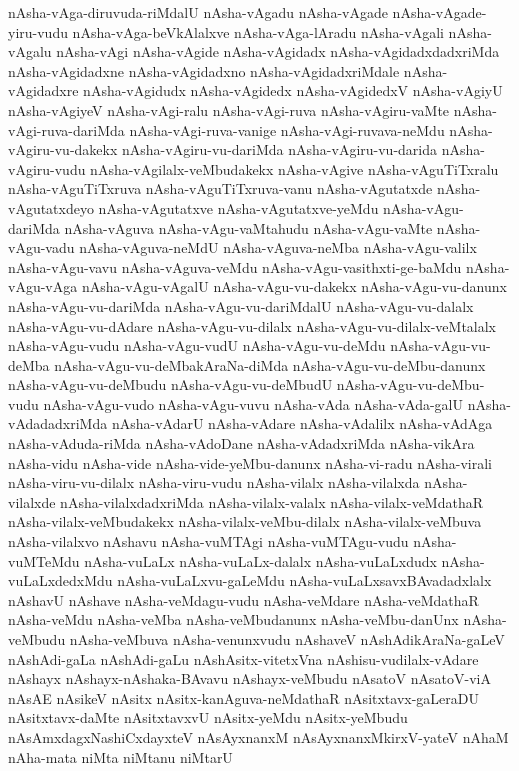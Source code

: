 {nAsha-vAga-diruvuda-riMdalU
nAsha-vAgadu
nAsha-vAgade
nAsha-vAgade-yiru-vudu
nAsha-vAga-beVkAlalxve
nAsha-vAga-lAradu
nAsha-vAgali
nAsha-vAgalu
nAsha-vAgi
nAsha-vAgide
nAsha-vAgidadx
nAsha-vAgidadxdadxriMda
nAsha-vAgidadxne
nAsha-vAgidadxno
nAsha-vAgidadxriMdale
nAsha-vAgidadxre
nAsha-vAgidudx
nAsha-vAgidedx
nAsha-vAgidedxV
nAsha-vAgiyU
nAsha-vAgiyeV
nAsha-vAgi-ralu
nAsha-vAgi-ruva
nAsha-vAgiru-vaMte
nAsha-vAgi-ruva-dariMda
nAsha-vAgi-ruva-vanige
nAsha-vAgi-ruvava-neMdu
nAsha-vAgiru-vu-dakekx
nAsha-vAgiru-vu-dariMda
nAsha-vAgiru-vu-darida
nAsha-vAgiru-vudu
nAsha-vAgilalx-veMbudakekx
nAsha-vAgive
nAsha-vAguTiTxralu
nAsha-vAguTiTxruva
nAsha-vAguTiTxruva-vanu
nAsha-vAgutatxde
nAsha-vAgutatxdeyo
nAsha-vAgutatxve
nAsha-vAgutatxve-yeMdu
nAsha-vAgu-dariMda
nAsha-vAguva
nAsha-vAgu-vaMtahudu
nAsha-vAgu-vaMte
nAsha-vAgu-vadu
nAsha-vAguva-neMdU
nAsha-vAguva-neMba
nAsha-vAgu-valilx
nAsha-vAgu-vavu
nAsha-vAguva-veMdu
nAsha-vAgu-vasithxti-ge-baMdu
nAsha-vAgu-vAga
nAsha-vAgu-vAgalU
nAsha-vAgu-vu-dakekx
nAsha-vAgu-vu-danunx
nAsha-vAgu-vu-dariMda
nAsha-vAgu-vu-dariMdalU
nAsha-vAgu-vu-dalalx
nAsha-vAgu-vu-dAdare
nAsha-vAgu-vu-dilalx
nAsha-vAgu-vu-dilalx-veMtalalx
nAsha-vAgu-vudu
nAsha-vAgu-vudU
nAsha-vAgu-vu-deMdu
nAsha-vAgu-vu-deMba
nAsha-vAgu-vu-deMbakAraNa-diMda
nAsha-vAgu-vu-deMbu-danunx
nAsha-vAgu-vu-deMbudu
nAsha-vAgu-vu-deMbudU
nAsha-vAgu-vu-deMbu-vudu
nAsha-vAgu-vudo
nAsha-vAgu-vuvu
nAsha-vAda
nAsha-vAda-galU
nAsha-vAdadadxriMda
nAsha-vAdarU
nAsha-vAdare
nAsha-vAdalilx
nAsha-vAdAga
nAsha-vAduda-riMda
nAsha-vAdoDane
nAsha-vAdadxriMda
nAsha-vikAra
nAsha-vidu
nAsha-vide
nAsha-vide-yeMbu-danunx
nAsha-vi-radu
nAsha-virali
nAsha-viru-vu-dilalx
nAsha-viru-vudu
nAsha-vilalx
nAsha-vilalxda
nAsha-vilalxde
nAsha-vilalxdadxriMda
nAsha-vilalx-valalx
nAsha-vilalx-veMdathaR
nAsha-vilalx-veMbudakekx
nAsha-vilalx-veMbu-dilalx
nAsha-vilalx-veMbuva
nAsha-vilalxvo
nAshavu
nAsha-vuMTAgi
nAsha-vuMTAgu-vudu
nAsha-vuMTeMdu
nAsha-vuLaLx
nAsha-vuLaLx-dalalx
nAsha-vuLaLxdudx
nAsha-vuLaLxdedxMdu
nAsha-vuLaLxvu-gaLeMdu
nAsha-vuLaLxsavxBAvadadxlalx
nAshavU
nAshave
nAsha-veMdagu-vudu
nAsha-veMdare
nAsha-veMdathaR
nAsha-veMdu
nAsha-veMba
nAsha-veMbudanunx
nAsha-veMbu-danUnx
nAsha-veMbudu
nAsha-veMbuva
nAsha-venunxvudu
nAshaveV
nAshAdikAraNa-gaLeV
nAshAdi-gaLa
nAshAdi-gaLu
nAshAsitx-vitetxVna
nAshisu-vudilalx-vAdare
nAshayx
nAshayx-nAshaka-BAvavu
nAshayx-veMbudu
nAsatoV
nAsatoV-viA
nAsAE
nAsikeV
nAsitx
nAsitx-kanAguva-neMdathaR
nAsitxtavx-gaLeraDU
nAsitxtavx-daMte
nAsitxtavxvU
nAsitx-yeMdu
nAsitx-yeMbudu
nAsAmxdagxNashiCxdayxteV
nAsAyxnanxM
nAsAyxnanxMkirxV-yateV
nAhaM
nAha-mata
niMta
niMtanu
niMtarU
}
